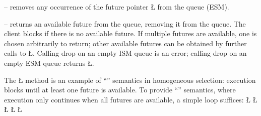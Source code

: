 \documentclass[openright,twoside]{report}
\begin{document}
\begin{prefix}
\item[\LGinlinetrue\LGbegin\lgrinde\L{\LB{\V{remove}(\0\V{Selectee}\0\*\0\V{n}\0)}}\endlgrinde\LGend{}]
-- removes any occurrence of the future pointer \LGinlinetrue\LGbegin\lgrinde\L{}\endlgrinde\LGend{} from the queue (ESM).
\item[\LGinlinetrue\LGbegin\lgrinde\L{\LB{\V{drop}}}\endlgrinde\LGend{}]
-- returns an available future from the queue, removing it from the queue.
The client blocks if there is no available future.
If multiple futures are available, one is chosen arbitrarily to return;
other available futures can be obtained by further calls to \LGinlinetrue\LGbegin\lgrinde\L{}\endlgrinde\LGend{}.
Calling drop on an empty ISM queue is an error;
calling drop on an empty ESM queue returns \LGinlinetrue\LGbegin\lgrinde\L{}\endlgrinde\LGend{}.
\end{prefix}

The \LGinlinetrue\LGbegin\lgrinde\L{}\endlgrinde\LGend{} method is an example of ``'' semantics in homogeneous selection:
execution blocks until at least one future is available.
To provide ``'' semantics, where execution only continues when all futures are available, a simple loop suffices:
\LGinlinefalse\LGbegin\lgrinde
\L{}
\CE{}\L{}
\CE{}\L{}
\CE{}\L{\LB{}}
\L{\LB{\}}}
\endlgrinde\LGend
\end{document}
